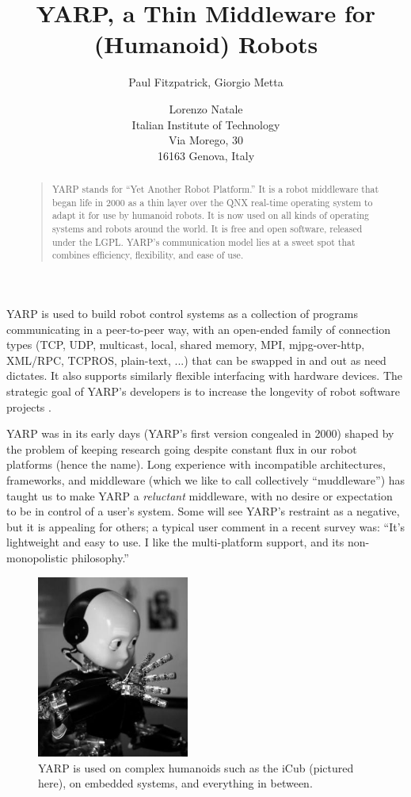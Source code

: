 \documentclass[letterpaper]{article}
\title{YARP, a Thin Middleware for (Humanoid) Robots}
\author{Paul Fitzpatrick{\rm ,} Giorgio Metta \and Lorenzo Natale \\
Italian Institute of Technology \\
Via Morego, 30 \\16163 Genova, Italy}
\begin{document}
 
\maketitle
\begin{abstract}
\begin{quote}

YARP stands for ``Yet Another Robot Platform.''  It is a robot
middleware that began life in 2000 as a thin layer over the QNX
real-time operating system to adapt it for use by humanoid robots.  It
is now used on all kinds of operating systems and robots around the
world.  It is free and open software, released under the LGPL.
YARP's communication model lies at a sweet spot that combines
efficiency, flexibility, and ease of use.

\end{quote}
\end{abstract}

\noindent 

YARP is used to build robot control systems as a collection of
programs communicating in a peer-to-peer way, with an open-ended
family of connection types (TCP, UDP, multicast, local, shared memory, 
MPI, mjpg-over-http, XML/RPC, TCPROS, plain-text, ...) that
can be swapped in and out
as need dictates.
It also supports similarly flexible interfacing
with hardware devices.  The strategic goal
of YARP's developers is to increase the longevity
of robot software projects \cite{fitzpatrick08towards}.

YARP was in its early days (YARP's first version congealed in 2000)
shaped by the problem of keeping research going despite constant flux
in our robot platforms (hence the name).  Long experience with
incompatible architectures, frameworks, and middleware (which we like
to call collectively ``muddleware'') has taught us to make YARP a {\it
  reluctant} middleware, with no desire or expectation to be in
control of a user's system.  Some will see YARP's restraint as a
negative, but it is appealing for others; a typical user comment in a
recent survey was: ``It's lightweight and easy to use. I like the
multi-platform support, and its non-monopolistic philosophy.''

\begin{figure}
\centerline{\includegraphics[width=5cm]{icub.jpg}}
\caption{YARP is used on
complex humanoids such as the iCub (pictured here),
on embedded systems, and everything in between.
} 
\end{figure}
\end{document}

